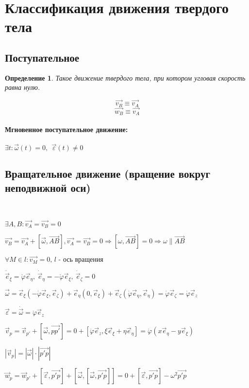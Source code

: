 \documentclass{article}
\renewcommand{\v}[1]{{\vec{#1}}}
\newtheorem*{df}{Определение}
\begin{document}
  \section{Классификация движения твердого тела}
  
  \subsection{Поступательное}
  \begin{df}
  Такое движение твердого тела, при котором угловая скорость равна нулю.
  \end{df}
  $$ \v{v_B} \equiv \v{v_A} $$
  $$ \v{w_B} \equiv \v{v_A} $$
  \paragraph{Мгновенное поступательное движение:}
  $ \exists t : \v{\omega}(t) = 0,~~ \v{\varepsilon}(t) \neq 0 $
  
  \subsection{Вращательное движение (вращение вокруг неподвижной оси)}
  ~

  $ \exists A, B : \v{v_A} = \v{v_B} = 0 $
  
  $ \v{v_B} = \v{v_A} + [\v{\omega}, \v{AB}], \v{v_A} = \v{v_B} = 0 \Rightarrow [\omega, \v{AB}] = 0 \Rightarrow \omega \parallel \v{AB} $
  
  $\forall M \in l : \v{v_M} = 0 \text{, $l$ - ось вращения} $
  
  $\dot{\vec{e}}_{\xi} = \dot{\varphi} \vec{e}_{\eta},~ \dot{\vec{e}}_{\eta} = -\dot{\varphi} \vec{e}_{\xi},~ \dot{\vec{e}}_{\zeta} = 0 $

  $\vec{\omega} = \vec{e}_{\xi}(-\dot{\varphi}\vec{e}_{\xi}, \vec{e}_{\zeta}) + \vec{e}_{\eta}(0, \vec{e}_{\xi}) + \vec{e}_{\zeta}(\dot{\varphi} \vec{e}_{\eta}, \vec{e}_{\eta}) = \dot{\varphi} \vec{e}_{\zeta} = \dot{\varphi}\vec{e}_{z} $

  $ \vec{\varepsilon} = \dot{\vec{\omega}} = \ddot{\varphi}\vec{e}_z $

  $ \vec{v}_p = \vec{v}_{p'} + [\vec{\omega}, \overrightarrow{pp'}] = 0 + [\dot{\varphi}\vec{e}_z, \xi\vec{e}_{\xi} + \eta\vec{e}_{\eta}] = \dot{\varphi}(x\vec{e}_{\eta} - y\vec{e}_{\xi}) $

  $ | \vec{v}_p | = | \vec{\omega} | \cdot | \overrightarrow{p'p} | $

  $ \vec{w}_p = \vec{w}_{p'} + [\vec{\varepsilon}, \overrightarrow{p'p}] + [\vec{\omega}, [\vec{\omega}, \overrightarrow{p'p}]] = 0 + [\vec{\varepsilon}, \overrightarrow{p'p}] - \omega^2 \overrightarrow{p'p} $
\end{document}
